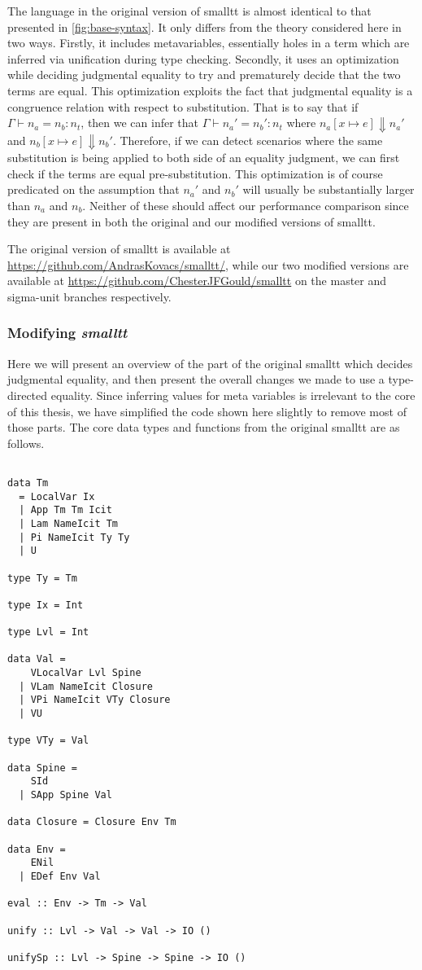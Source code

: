 \documentclass[sigplan]{acmart}
\newcommand{\tyEqJ}[4]{#1 \vdash #2 = #3 : #4}
\newcommand{\steps}[2]{#1 \Downarrow #2}
\newcommand{\subst}[3]{#1 [#2 \mapsto #3]}
\begin{document}
The language in the original version of smalltt is almost identical to that presented in \autoref{fig:base-syntax}.
It only differs from the theory considered here in two ways.
Firstly, it includes metavariables, essentially holes in a term which are inferred via unification during type checking.
Secondly, it uses an optimization while deciding judgmental equality to try and prematurely decide that the two terms are equal.
This optimization exploits the fact that judgmental equality is a congruence relation with respect to substitution.
That is to say that if $\tyEqJ{\Gamma}{n_a}{n_b}{n_t}$, then we can infer that $\tyEqJ{\Gamma}{n_a'}{n_b'}{n_t}$ where $\steps{\subst{n_a}{x}{e}}{n_a'}$ and $\steps{\subst{n_b}{x}{e}}{n_b'}$.
Therefore, if we can detect scenarios where the same substitution is being applied to both side of an equality judgment, we can first check if the terms are equal pre-substitution.
This optimization is of course predicated on the assumption that $n_a'$ and $n_b'$ will usually be substantially larger than $n_a$ and $n_b$.
Neither of these should affect our performance comparison since they are present in both the original and our modified versions of smalltt.

The original version of smalltt is available at \url{https://github.com/AndrasKovacs/smalltt/}, while our two modified versions are available at \url{https://github.com/ChesterJFGould/smalltt} on the master and sigma-unit branches respectively.

\subsubsection{Modifying \textit{smalltt}}

Here we will present an overview of the part of the original smalltt which decides judgmental equality, and then present the overall changes we made to use a type-directed equality.
Since inferring values for meta variables is irrelevant to the core of this thesis, we have simplified the code shown here slightly to remove most of those parts.
The core data types and functions from the original smalltt are as follows.

\newpage

\begin{lstlisting}

data Tm
  = LocalVar Ix
  | App Tm Tm Icit
  | Lam NameIcit Tm
  | Pi NameIcit Ty Ty
  | U

type Ty = Tm

type Ix = Int

type Lvl = Int

data Val =
    VLocalVar Lvl Spine
  | VLam NameIcit Closure
  | VPi NameIcit VTy Closure
  | VU

type VTy = Val

data Spine =
    SId
  | SApp Spine Val

data Closure = Closure Env Tm

data Env =
    ENil
  | EDef Env Val

eval :: Env -> Tm -> Val

unify :: Lvl -> Val -> Val -> IO ()

unifySp :: Lvl -> Spine -> Spine -> IO ()
\end{lstlisting}
\end{document}
